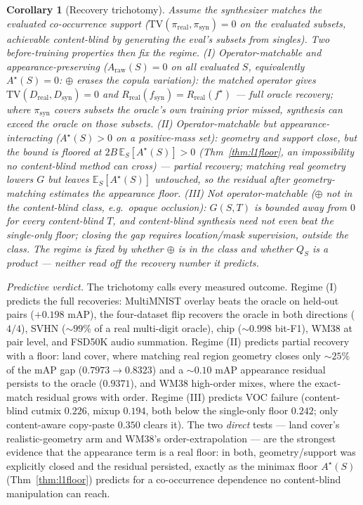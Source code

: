 \documentclass[11pt]{article}
\newtheorem{corollary}{Corollary}
\begin{document}
\begin{corollary}[Recovery trichotomy]\label{cor:trichotomy}
Assume the synthesizer matches the evaluated co-occurrence support ($\mathrm{TV}(\pi_{\mathrm{real}},\pi_{\mathrm{syn}})=0$
on the evaluated subsets, achievable content-blind by generating the eval's subsets from
singles). Two before-training properties then fix the regime.
\emph{(I) Operator-matchable and appearance-preserving} ($A_{\mathrm{raw}}(S)=0$ on all
evaluated $S$, equivalently $A^\star(S)=0$: $\oplus$ erases the copula variation): the matched
operator gives $\mathrm{TV}(D_{\mathrm{real}},D_{\mathrm{syn}})=0$ and
$R_{\mathrm{real}}(f_{\mathrm{syn}})=R_{\mathrm{real}}(f^\star)$ --- \emph{full} oracle
recovery; where $\pi_{\mathrm{syn}}$ covers subsets the oracle's own training prior missed,
synthesis can \emph{exceed} the oracle on those subsets.
\emph{(II) Operator-matchable but appearance-interacting} ($A^\star(S)>0$ on a
positive-mass set): geometry and support close, but the bound is floored at
$2B\,\mathbb{E}_S[A^\star(S)]>0$ (Thm~\ref{thm:l1floor}, an impossibility no content-blind method
can cross) --- \emph{partial} recovery; matching real geometry lowers $G$ but leaves
$\mathbb{E}_S[A^\star(S)]$ untouched, so the residual after geometry-matching estimates the
appearance floor.
\emph{(III) Not operator-matchable} ($\oplus$ not in the content-blind class, e.g.\ opaque
occlusion): $G(S,T)$ is bounded away from $0$ for every content-blind $T$, and content-blind
synthesis need not even beat the single-only floor; closing the gap requires location/mask
supervision, outside the class.
The regime is fixed by \emph{whether $\oplus$ is in the class} and \emph{whether $Q_S$ is a
product} --- neither read off the recovery number it predicts.
\end{corollary}

\emph{Predictive verdict.} The trichotomy calls every measured outcome. Regime (I) predicts the
full recoveries: MultiMNIST overlay beats the oracle on held-out pairs ($+0.198$ mAP), the
four-dataset flip recovers the oracle in both directions ($4/4$), SVHN ($\sim99\%$ of a real
multi-digit oracle), chip ($\sim0.998$ bit-F1), WM38 at pair level, and FSD50K audio
summation. Regime (II) predicts partial recovery with a floor: land cover, where matching real
region geometry closes only ${\sim}25\%$ of the mAP gap ($0.7973\to0.8323$) and a ${\sim}0.10$
mAP appearance residual persists to the oracle ($0.9371$), and WM38 high-order mixes, where the
exact-match residual grows with order. Regime (III) predicts VOC failure (content-blind cutmix
$0.226$, mixup $0.194$, both below the single-only floor $0.242$; only content-aware copy-paste
$0.350$ clears it). The two \emph{direct} tests --- land cover's realistic-geometry arm and
WM38's order-extrapolation --- are the strongest evidence that the appearance term is a real
floor: in both, geometry/support was explicitly closed and the residual persisted, exactly as the
minimax floor $A^\star(S)$ (Thm~\ref{thm:l1floor}) predicts for a co-occurrence dependence no
content-blind manipulation can reach.
\end{document}
